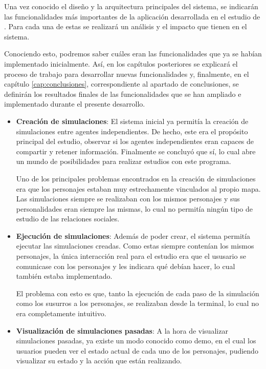 Una vez conocido el diseño y la arquitectura principales del sistema, se indicarán las funcionalidades más importantes de la aplicación desarrollada en el estudio de \ga. Para cada una de estas se realizará un análisis y el impacto que tienen en el sistema.

Conociendo esto, podremos saber cuáles eran las funcionalidades que ya se habían implementado inicialmente. Así, en los capítulos posteriores se explicará el proceso de trabajo para desarrollar nuevas funcionalidades y, finalmente, en el capítulo \ref{cap:conclusiones}, correspondiente al apartado de conclusiones, se definirán los resultados finales de las funcionalidades que se han ampliado e implementado durante el presente desarrollo.

\begin{itemize}
	\item\textbf{Creación de simulaciones}: El sistema inicial ya permitía la creación de simulaciones entre agentes independientes. De hecho, este era el propósito principal del estudio, observar si los agentes independientes eran capaces de compartir y retener información. Finalmente se concluyó que sí, lo cual abre un mundo de posibilidades para realizar estudios con este programa.
	
	Uno de los principales problemas encontrados en la creación de simulaciones era que los personajes estaban muy estrechamente vinculados al propio mapa. Las simulaciones siempre se realizaban con los mismos personajes y sus personalidades eran siempre las mismas, lo cual no permitía ningún tipo de estudio de las relaciones sociales.
	
	\item\textbf{Ejecución de simulaciones}: Además de poder crear, el sistema permitía ejecutar las simulaciones creadas. Como estas siempre contenían los mismos personajes, la única interacción real para el estudio era que el ususario se comunicase con los personajes y les indicara qué debían hacer, lo cual también estaba implementado.
	
	El problema con esto es que, tanto la ejecución de cada paso de la simulación como los susurros a los personajes, se realizaban desde la terminal, lo cual no era completamente intuitivo.
	
	\item\textbf{Visualización de simulaciones pasadas}: A la hora de visualizar simulaciones pasadas, ya existe un modo conocido como demo, en el cual los usuarios pueden ver el estado actual de cada uno de los personajes, pudiendo visualizar su estado y la acción que están realizando.
	

\end{itemize}
